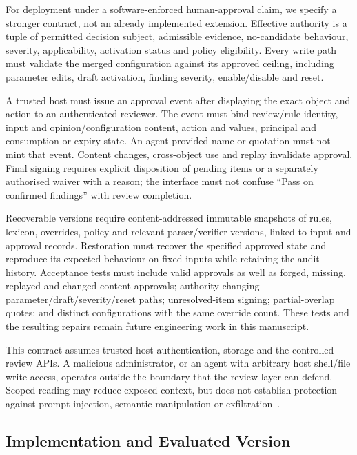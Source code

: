 \documentclass[computers,article,submit,moreauthors]{Definitions/mdpi}
\begin{document}
For deployment under a software-enforced human-approval claim, we specify a stronger contract, not an already implemented extension. Effective authority is a tuple of permitted decision subject, admissible evidence, no-candidate behaviour, severity, applicability, activation status and policy eligibility. Every write path must validate the merged configuration against its approved ceiling, including parameter edits, draft activation, finding severity, enable/disable and reset.

A trusted host must issue an approval event after displaying the exact object and action to an authenticated reviewer. The event must bind review/rule identity, input and opinion/configuration content, action and values, principal and consumption or expiry state. An agent-provided name or quotation must not mint that event. Content changes, cross-object use and replay invalidate approval. Final signing requires explicit disposition of pending items or a separately authorised waiver with a reason; the interface must not confuse ``Pass on confirmed findings'' with review completion.

Recoverable versions require content-addressed immutable snapshots of rules, lexicon, overrides, policy and relevant parser/verifier versions, linked to input and approval records. Restoration must recover the specified approved state and reproduce its expected behaviour on fixed inputs while retaining the audit history. Acceptance tests must include valid approvals as well as forged, missing, replayed and changed-content approvals; authority-changing parameter/draft/severity/reset paths; unresolved-item signing; partial-overlap quotes; and distinct configurations with the same override count. These tests and the resulting repairs remain future engineering work in this manuscript.

This contract assumes trusted host authentication, storage and the controlled review APIs. A malicious administrator, or an agent with arbitrary host shell/file write access, operates outside the boundary that the review layer can defend. Scoped reading may reduce exposed context, but does not establish protection against prompt injection, semantic manipulation or exfiltration~\cite{shi2024inject,mempriv2025}.

\subsection{Implementation and Evaluated Version}\label{sec:impl}
\end{document}
